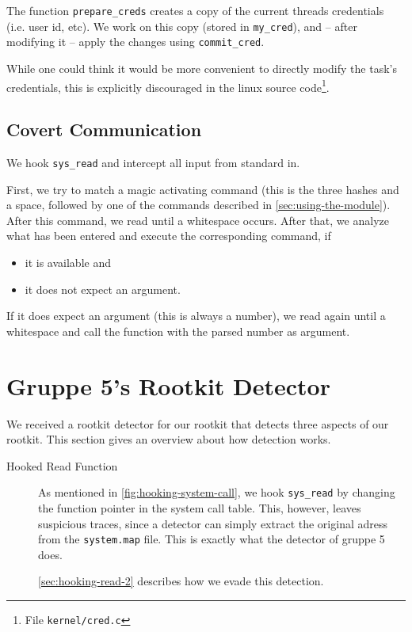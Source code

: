 \documentclass[10pt, letterpaper]{article}
\begin{document}
The function \texttt{prepare\_creds} creates a copy of the current threads credentials (i.e. user id, etc). We work on this copy (stored in \texttt{my\_cred}), and -- after modifying it -- apply the changes using \texttt{commit\_cred}.

While one could think it would be more convenient to directly modify the task's credentials, this is explicitly discouraged in the linux source code\footnote{File \texttt{kernel/cred.c}}.

\subsection{Covert Communication}
We hook \texttt{sys\_read} and intercept all input from standard in. 

First, we try to match a magic activating command (this is the three hashes and a space, followed by one of the commands described in \autoref{sec:using-the-module}). After this command, we read until a whitespace occurs. After that, we analyze what has been entered and execute the corresponding command, if 

\begin{itemize}
 \item it is available and
 \item it does not expect an argument.
\end{itemize}

If it does expect an argument (this is always a number), we read again until a whitespace and call the function with the parsed number as argument.

\section{Gruppe 5's Rootkit Detector}
\label{sec:detectorofgruppe5}

We received a rootkit detector for our rootkit that detects three aspects of our rootkit. This section gives an overview about how detection works.

\begin{description}
\item[Hooked Read Function] As mentioned in \autoref{fig:hooking-system-call}, we hook \texttt{sys\_read} by changing the function pointer in the system call table. This, however, leaves suspicious traces, since a detector can simply extract the original adress from the \texttt{system.map} file. This is exactly what the detector of gruppe 5 does.

\autoref{sec:hooking-read-2} describes how we evade this detection.
\end{description}
\end{document}
